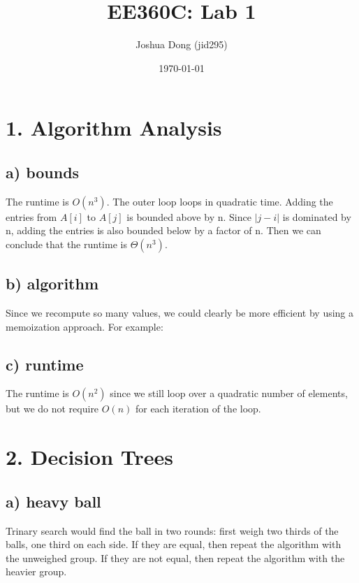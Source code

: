 \documentclass{article}
\begin{document}
\title{EE360C: Lab 1}
\author{Joshua Dong (jid295)}
\date{\today}
\maketitle

\section*{1. Algorithm Analysis}
\subsection*{a) bounds}
The runtime is $O(n^3)$. The outer loop loops in quadratic time. Adding the
entries from $A[i]$ to $A[j]$ is bounded above by n. Since
$\left|j - i\right|$ is dominated by n, adding the entries is also bounded
below by a factor of n. Then we can conclude that the runtime is
$\Theta(n^3)$.

\subsection*{b) algorithm}
Since we recompute so many values, we could clearly be more
efficient by using a memoization approach. For example:
\begin{algorithmic}
        \Else
        \EndIf
    \EndFor
\EndFor
\end{algorithmic}

\subsection*{c) runtime}
The runtime is $O(n^2)$ since we still loop over a quadratic number of
elements, but we do not require $O(n)$ for each iteration of the loop.


\newpage
\section*{2. Decision Trees}
\subsection*{a) heavy ball}
Trinary search would find the ball in two rounds: first weigh two thirds
of the balls, one third on each side. If they are equal, then repeat the
algorithm with the unweighed group. If they are not equal, then repeat the
algorithm with the heavier group.
\end{document}
